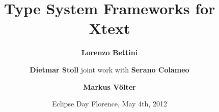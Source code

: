 \title{Type System Frameworks for Xtext}
\author{\textbf{Lorenzo Bettini} \and \textbf{Dietmar Stoll}\br
joint work with\br
\textbf{Serano Colameo} \and \textbf{Markus V\"olter}}
\date{Eclipse Day Florence, May 4th, 2012}


\maketitle 
















